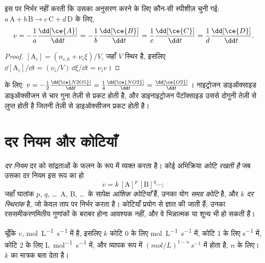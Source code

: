 \begin{proposition}[सभी स्पीशीज़ के लिए एक ही दर]\label{prop:b1:rate-laws:rate-relations}
 इस पर निर्भर नहीं करती कि उसका अनुसरण करने के लिए कौन-सी स्पीशीज़ चुनी गई:
$a\,\mathrm{A} + b\,\mathrm{B} \longrightarrow c\,\mathrm{C} + d\,\mathrm{D}$ के लिए,
\[
  v = -\frac1a\frac{\dd[\ce{A}]}{\dd t} = -\frac1b\frac{\dd[\ce{B}]}{\dd t}
  = \frac1c\frac{\dd[\ce{C}]}{\dd t} = \frac1d\frac{\dd[\ce{D}]}{\dd t} .
\]
\end{proposition}

\begin{proof}
$[\mathrm{A}_i] = (n_{i,0} + \nu_i\xi)/V$, जहाँ $V$ स्थिर है, इसलिए
$\dd[\mathrm{A}_i]/\dd t = (\nu_i/V)\,\dd\xi/\dd t = \nu_i v$।
\end{proof}

\begin{example}[डाइनाइट्रोजन पेंटॉक्साइड का विघटन]\label{ex:b1:rate-laws:n2o5}
 के लिए: $v = -\frac12\frac{\dd[\ce{N2O5}]}{\dd t} =
\frac14\frac{\dd[\ce{NO2}]}{\dd t} = \frac{\dd[\ce{O2}]}{\dd t}$। नाइट्रोजन
डाइऑक्साइड डाइऑक्सीजन से चार गुना तेज़ी से प्रकट होती है, और डाइनाइट्रोजन पेंटॉक्साइड
उससे दोगुनी तेज़ी से लुप्त होती है जितनी तेज़ी से डाइऑक्सीजन प्रकट होती है।
\end{example}

\section{दर नियम और कोटियाँ}

\begin{definition}[दर नियम, कोटियाँ, दर स्थिरांक]\label{def:b1:rate-laws:order}
\emph{दर नियम} दर को
सांद्रताओं के फलन के रूप में व्यक्त करता है। कोई अभिक्रिया \emph{कोटि रखती है} जब उसका दर नियम
इस रूप का हो
\[
  v = k\,[\mathrm{A}]^{p}\,[\mathrm{B}]^{q} \cdots ;
\]
जहाँ घातांक $p$, $q$, \dots\ A, B, \dots\ के सापेक्ष \emph{आंशिक कोटियाँ}
हैं, उनका योग \emph{समग्र
कोटि} है, और $k$ \emph{दर स्थिरांक} है,
जो केवल ताप पर निर्भर करता है। कोटियाँ
प्रयोग से ज्ञात की जाती हैं; उनका रससमीकरणमितीय गुणांकों के बराबर होना आवश्यक नहीं, और वे
भिन्नात्मक या शून्य भी हो सकती हैं।
\end{definition}

\begin{remark}[$k$ के मात्रक]\label{rem:b1:rate-laws:units}
चूँकि $v$, \unit{mol.L^{-1}.s^{-1}} में है, इसलिए $k$ कोटि 0 के लिए
\unit{mol.L^{-1}.s^{-1}} में, कोटि 1 के लिए \unit{s^{-1}} में,
कोटि 2 के लिए \unit{L.mol^{-1}.s^{-1}} में, और व्यापक रूप में
$(\unit{mol/L})^{1-n}\,\unit{s^{-1}}$ में होता है,  $n$ के लिए। $k$ का
मात्रक  बता देता है।
\end{remark}

